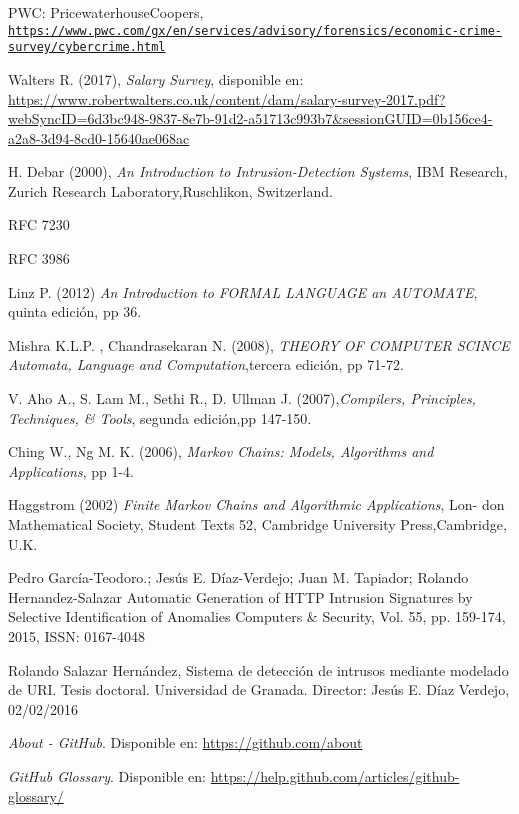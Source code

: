 \begin{thebibliography}{99}
PWC: PricewaterhouseCoopers,
\\\texttt{\url{https://www.pwc.com/gx/en/services/advisory/forensics/economic-crime-survey/cybercrime.html}}

Walters R. (2017), \textit{Salary Survey}, disponible en: \url{https://www.robertwalters.co.uk/content/dam/salary-survey-2017.pdf?webSyncID=6d3bc948-9837-8e7b-91d2-a51713c993b7&sessionGUID=0b156ce4-a2a8-3d94-8cd0-15640ae068ac}

H.   Debar (2000), \textit{An Introduction to Intrusion-Detection Systems},  IBM   Research,   Zurich   Research   Laboratory,Ruschlikon, Switzerland.

RFC 7230

RFC 3986

Linz P. (2012) \textit{An Introduction to FORMAL LANGUAGE an AUTOMATE}, quinta edición, pp 36.

Mishra K.L.P. , Chandrasekaran N. (2008), \textit{THEORY OF COMPUTER SCINCE Automata, Language and Computation},tercera edición, pp 71-72.

V. Aho A., S. Lam M., Sethi R., D. Ullman J. (2007),\textit{Compilers, Principles, Techniques, \& Tools}, segunda edición,pp 147-150.

Ching W., Ng M. K. (2006), \textit{Markov Chains: Models, Algorithms and Applications}, pp 1-4.

Haggstrom (2002) \textit{Finite Markov Chains and Algorithmic Applications}, Lon-
don Mathematical Society, Student Texts 52, Cambridge University Press,Cambridge, U.K.

Pedro García-Teodoro.; Jesús E. Díaz-Verdejo; Juan M. Tapiador; Rolando Hernandez-Salazar
Automatic Generation of HTTP Intrusion Signatures by Selective Identification of Anomalies
Computers \& Security, Vol. 55, pp. 159-174, 2015, ISSN: 0167-4048 

Rolando Salazar Hernández, Sistema de detección de intrusos mediante modelado de URI. Tesis doctoral. Universidad de Granada. Director: Jesús E. Díaz Verdejo, 02/02/2016

 \textit{About - GitHub}. Disponible en: \url{https://github.com/about}

 \textit{GitHub Glossary}. Disponible en: \url{https://help.github.com/articles/github-glossary/}


\end{thebibliography}
